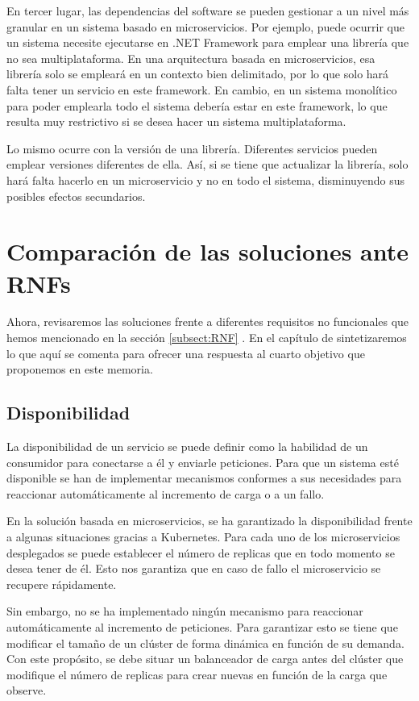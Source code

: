 \documentclass[11pt,spanish,listoffigures]{tfgetsinf}
\begin{document}
En tercer lugar, las dependencias del software se pueden gestionar a un nivel más granular en un sistema basado en microservicios. Por ejemplo, puede ocurrir que un sistema necesite ejecutarse en .NET Framework para emplear una librería que no sea multiplataforma. En una arquitectura basada en microservicios, esa librería solo se empleará en un contexto bien delimitado, por lo que solo hará falta tener un servicio en este framework. En cambio, en un sistema monolítico para poder emplearla todo el sistema debería estar en este framework, lo que resulta muy restrictivo si se desea hacer un sistema multiplataforma.

Lo mismo ocurre con la versión de una librería. Diferentes servicios pueden emplear versiones diferentes de ella. Así, si se tiene que actualizar la librería, solo hará falta hacerlo en un microservicio y no en todo el sistema, disminuyendo sus posibles efectos secundarios.

\section{Comparación de las soluciones ante RNFs}

Ahora, revisaremos las soluciones frente a diferentes requisitos no funcionales que hemos mencionado en la sección \ref{subsect:RNF} . En el capítulo de  sintetizaremos lo que aquí se comenta para ofrecer una respuesta al cuarto objetivo que proponemos en este memoria.

\subsection{Disponibilidad}

La disponibilidad de un servicio se puede definir como la habilidad de un consumidor para conectarse a él y enviarle peticiones. \cite{Richards2016} Para que un sistema esté disponible se han de implementar mecanismos conformes a sus necesidades para reaccionar automáticamente al incremento de carga o a un fallo. \cite{Newman2015a}

En la solución basada en microservicios, se ha garantizado la disponibilidad frente a algunas situaciones gracias a Kubernetes. Para cada uno de los microservicios desplegados se puede establecer el número de replicas que en todo momento se desea tener de él. Esto nos garantiza que en caso de fallo el microservicio se recupere rápidamente. 

Sin embargo, no se ha implementado ningún mecanismo para reaccionar automáticamente al incremento de peticiones. Para garantizar esto se tiene que modificar el tamaño de un clúster de forma dinámica en función de su demanda. Con este propósito, se debe situar un balanceador de carga antes del clúster que modifique el número de replicas para crear nuevas en función de la carga que observe. \cite{Rensin2015}
\end{document}
